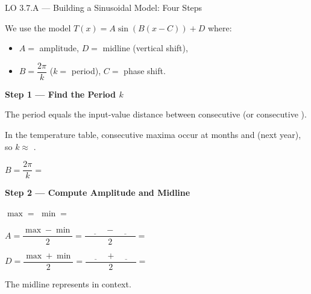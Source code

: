 \documentclass[10pt]{article}
\begin{document}
\begin{notesbox}{LO 3.7.A --- Building a Sinusoidal Model: Four Steps}

We use the model $T(x) = A\sin(B(x - C)) + D$ where:
\begin{itemize}[leftmargin=1.4em, itemsep=2pt]
  \item $A =$ amplitude, \quad $D =$ midline (vertical shift),
  \item $B = \dfrac{2\pi}{k}$ ($k =$ period), \quad $C =$ phase shift.
\end{itemize}

\vspace{8pt}
\textbf{Step 1 --- Find the Period $k$}

The period equals the input-value distance between consecutive \underline{\hspace{2.5cm}}
(or consecutive \underline{\hspace{2.5cm}}).

In the temperature table, consecutive maxima occur at months \underline{\hspace{1.2cm}}
and \underline{\hspace{1.2cm}} (next year), so $k \approx$ \underline{\hspace{1.5cm}}.

$B = \dfrac{2\pi}{k} = $ \underline{\hspace{3cm}}

\vspace{10pt}
\textbf{Step 2 --- Compute Amplitude and Midline}

$\max = $ \underline{\hspace{1.5cm}} \quad $\min = $ \underline{\hspace{1.5cm}}

$A = \dfrac{\max - \min}{2} = \dfrac{\underline{\hspace{1cm}} - \underline{\hspace{1cm}}}{2} =$ \underline{\hspace{2cm}}

$D = \dfrac{\max + \min}{2} = \dfrac{\underline{\hspace{1cm}} + \underline{\hspace{1cm}}}{2} =$ \underline{\hspace{2cm}}

The midline represents \underline{\hspace{7cm}} in context.


\end{notesbox}
\end{document}
